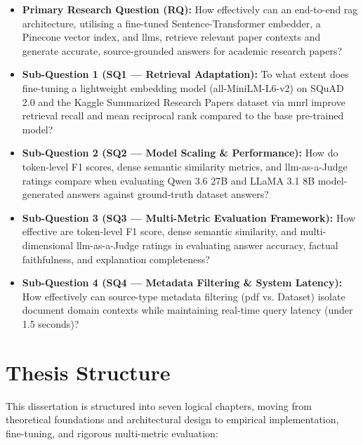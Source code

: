 \begin{itemize}
    \item \textbf{Primary Research Question (RQ):} How effectively can an end-to-end \gls{rag} architecture, utilising a fine-tuned Sentence-Transformer embedder, a Pinecone vector index, and \gls{llm}s, retrieve relevant paper contexts and generate accurate, source-grounded answers for academic research papers?
    \item \textbf{Sub-Question 1 (SQ1 — Retrieval Adaptation):} To what extent does fine-tuning a lightweight embedding model (all-MiniLM-L6-v2) on SQuAD 2.0 and the Kaggle Summarized Research Papers dataset via \gls{mnrl} improve retrieval recall and mean reciprocal rank compared to the base pre-trained model?
    \item \textbf{Sub-Question 2 (SQ2 — Model Scaling \& Performance):} How do token-level F1 scores, dense semantic similarity metrics, and \gls{llm}-as-a-Judge ratings compare when evaluating Qwen 3.6 27B and LLaMA 3.1 8B model-generated answers against ground-truth dataset answers?
    \item \textbf{Sub-Question 3 (SQ3 — Multi-Metric Evaluation Framework):} How effective are token-level F1 score, dense semantic similarity, and multi-dimensional \gls{llm}-as-a-Judge ratings in evaluating answer accuracy, factual faithfulness, and explanation completeness?
    \item \textbf{Sub-Question 4 (SQ4 — Metadata Filtering \& System Latency):} How effectively can source-type metadata filtering (\gls{pdf} vs. Dataset) isolate document domain contexts while maintaining real-time query latency (under 1.5 seconds)?
\end{itemize}

\section{Thesis Structure}

This dissertation is structured into seven logical chapters, moving from theoretical foundations and architectural design to empirical implementation, fine-tuning, and rigorous multi-metric evaluation:

